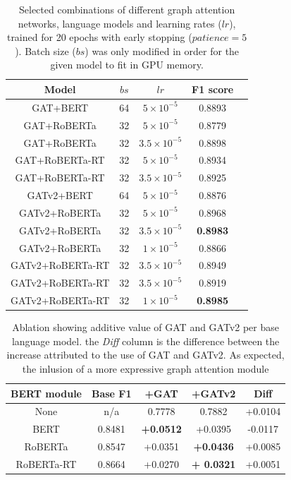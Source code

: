 \documentclass[letterpaper]{article} %
\begin{document}
\begin{table}
    \begin{tabular}{|c||c|c|c|c|}
        \hline
        Model & $bs$ & $lr$ & F1 score \\
        \hline 
        \hline
        GAT+BERT & 64 & $5\times10^{-5}$ &  0.8893 \\
        GAT+RoBERTa & 32 & $5\times10^{-5}$ &  0.8779 \\
        GAT+RoBERTa & 32 & $3.5\times10^{-5}$ &  0.8898 \\
        GAT+RoBERTa-RT & 32 & $5\times10^{-5}$  & 0.8934 \\
        GAT+RoBERTa-RT & 32 & $3.5\times10^{-5}$  & 0.8925 \\
        GATv2+BERT & 64 & $5\times10^{-5}$  & 0.8876 \\
        GATv2+RoBERTa & 32 & $5\times10^{-5}$ &  0.8968 \\
        GATv2+RoBERTa & 32 & $3.5\times10^{-5}$ &  \textbf{0.8983} \\
        GATv2+RoBERTa & 32 & $1\times10^{-5}$ &  0.8866 \\
        GATv2+RoBERTa-RT & 32 & $3.5\times10^{-5}$  & 0.8949 \\
        GATv2+RoBERTa-RT & 32 & $3.5\times10^{-5}$  & 0.8919 \\
        GATv2+RoBERTa-RT & 32 & $1\times10^{-5}$  & \textbf{0.8985} \\
        \hline
    \end{tabular}
    \caption{Selected combinations of different graph attention networks, language models and learning rates ($lr$), trained for 20 epochs with early stopping ($patience=5$). Batch size ($bs$) was only modified in order for the given model to fit in GPU memory.}
\end{table}


\begin{table}
    \begin{tabular}{|c||c|c|c|c|}
        \hline 
        BERT module & Base F1 & +GAT & +GATv2 & Diff \\
        \hline
        \hline
        None & n/a & 0.7778 & 0.7882 & +0.0104 \\
        BERT & 0.8481 & \textbf{+0.0512} &  +0.0395  & -0.0117 \\
        RoBERTa & 0.8547 & +0.0351 & \textbf{+0.0436} & +0.0085 \\
        RoBERTa-RT & 0.8664 & +0.0270 & \textbf{+ 0.0321} & +0.0051 \\
        \hline
    \end{tabular}
    \caption{Ablation showing additive value of GAT and GATv2 per base language model. the \textit{Diff} column is the difference between the increase attributed to the use of GAT and GATv2. As expected, the inlusion of a more expressive graph attention module }
\end{table}
\end{document}
